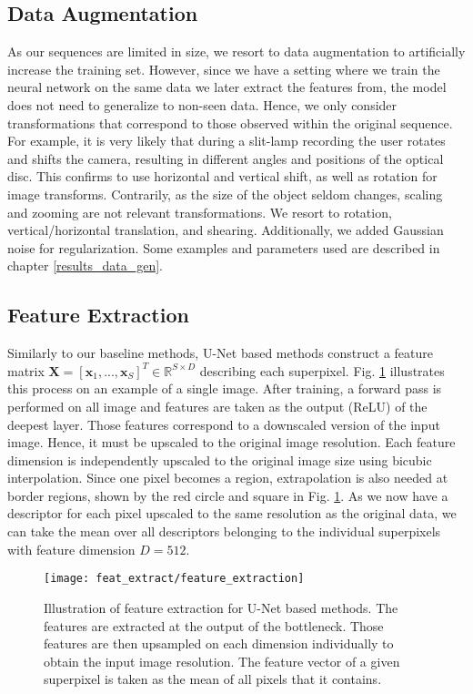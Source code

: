 \subsection{Data Augmentation} \label{ch:data_gen}
As our sequences are limited in size, we resort to data augmentation to artificially increase the training set.
However, since we have a setting where we train the neural network on the same data we later extract the features from, the model does not need to generalize to non-seen data.
Hence, we only consider transformations that correspond to those observed within the original sequence.
For example, it is very likely that during a slit-lamp recording the user rotates and shifts the camera, resulting in different angles and positions of the optical disc.
This confirms to use horizontal and vertical shift, as well as rotation for image transforms.
Contrarily, as the size of the object seldom changes, scaling and zooming are not relevant transformations.
We resort to rotation, vertical/horizontal translation, and shearing.
Additionally, we added Gaussian noise for regularization.
Some examples and parameters used are described in chapter \ref{results_data_gen}.

\clearpage
\subsection{Feature Extraction} \label{feat_extract}
Similarly to our baseline methods, U-Net based methods construct a feature matrix $\boldsymbol{X} = [\boldsymbol{x}_1,...,\boldsymbol{x}_S]^T \in \mathbb{R}^{S \times D}$ describing each superpixel.
Fig. \ref{fig:feat_extract} illustrates this process on an example of a single image.
After training, a forward pass is performed on all image and features are taken as the output (ReLU) of the deepest layer.
Those features correspond to a downscaled version of the input image.
Hence, it must be upscaled to the original image resolution.
Each feature dimension is independently upscaled to the original image size using bicubic interpolation.
Since one pixel becomes a region, extrapolation is also needed at border regions, shown by the red circle and square in Fig. \ref{fig:feat_extract}.
As we now have a descriptor for each pixel upscaled to the same resolution as the original data, we can take the mean over all descriptors belonging to the individual superpixels with feature dimension $D=512$.
\vspace{10pt}

\begin{figure}[htbp]
  \centering
  \texttt{[image: feat\_extract/feature\_extraction]}
  \caption[Feature extraction model]{Illustration of feature extraction for U-Net based methods.
    The features are extracted at the output of the bottleneck.
    Those features are then upsampled on each dimension individually to obtain the input image resolution.
    The feature vector of a given superpixel is taken as the mean of all pixels that it contains.}
  \label{fig:feat_extract}
\end{figure}

